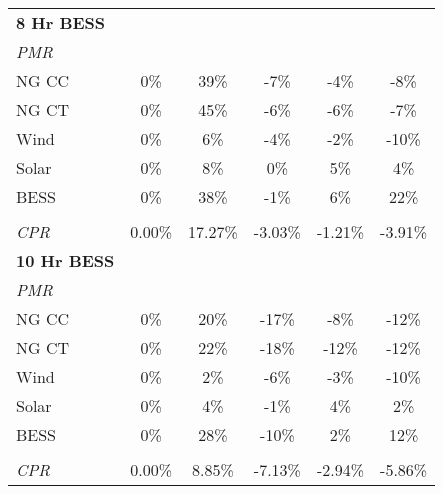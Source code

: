 \begin{table}[]
\begin{tabular}{lccccc}
\textbf{8 Hr BESS} &  &  &  &  & \\
 \quad \textit{PMR}  &  &  &  &  & \\
\qquad NG CC & 0\% & 39\% & -7\% & -4\% & -8\% \\
\qquad NG CT & 0\% & 45\% & -6\% & -6\% & -7\% \\
\qquad Wind & 0\% & 6\% & -4\% & -2\% & -10\% \\
\qquad Solar & 0\% & 8\% & 0\% & 5\% & 4\% \\
\qquad BESS & 0\% & 38\% & -1\% & 6\% & 22\% \\
&  &  &  &  & \\
\quad \textit{CPR} & 0.00\% & 17.27\% & -3.03\% & -1.21\% & -3.91\% \\\hline
\textbf{10 Hr BESS} &  &  &  &  & \\
 \quad \textit{PMR}  &  &  &  &  & \\
\qquad NG CC & 0\% & 20\% & -17\% & -8\% & -12\% \\
\qquad NG CT & 0\% & 22\% & -18\% & -12\% & -12\% \\
\qquad Wind & 0\% & 2\% & -6\% & -3\% & -10\% \\
\qquad Solar & 0\% & 4\% & -1\% & 4\% & 2\% \\
\qquad BESS & 0\% & 28\% & -10\% & 2\% & 12\% \\
&  &  &  &  & \\
\quad \textit{CPR} & 0.00\% & 8.85\% & -7.13\% & -2.94\% & -5.86\% \\\hline
\end{tabular}
\end{table}

